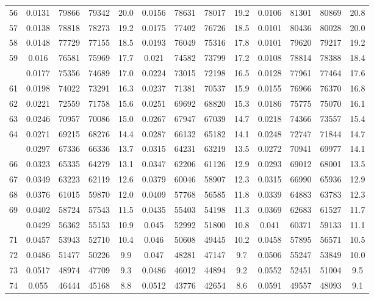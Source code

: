 \documentclass[
  14pt,
]{article}
\begin{document}
\begin{longtable}[t]{lcccccccccccc}
56 & 0.0131 & 79866 & 79342 & 20.0 & 0.0156 & 78631 & 78017 & 19.2 & 0.0106 & 81301 & 80869 & 20.8\\
57 & 0.0138 & 78818 & 78273 & 19.2 & 0.0175 & 77402 & 76726 & 18.5 & 0.0101 & 80436 & 80028 & 20.0\\
58 & 0.0148 & 77729 & 77155 & 18.5 & 0.0193 & 76049 & 75316 & 17.8 & 0.0101 & 79620 & 79217 & 19.2\\
59 & 0.016 & 76581 & 75969 & 17.7 & 0.021 & 74582 & 73799 & 17.2 & 0.0108 & 78814 & 78388 & 18.4\\
\addlinespace
60 & 0.0177 & 75356 & 74689 & 17.0 & 0.0224 & 73015 & 72198 & 16.5 & 0.0128 & 77961 & 77464 & 17.6\\
61 & 0.0198 & 74022 & 73291 & 16.3 & 0.0237 & 71381 & 70537 & 15.9 & 0.0155 & 76966 & 76370 & 16.8\\
62 & 0.0221 & 72559 & 71758 & 15.6 & 0.0251 & 69692 & 68820 & 15.3 & 0.0186 & 75775 & 75070 & 16.1\\
63 & 0.0246 & 70957 & 70086 & 15.0 & 0.0267 & 67947 & 67039 & 14.7 & 0.0218 & 74366 & 73557 & 15.4\\
64 & 0.0271 & 69215 & 68276 & 14.4 & 0.0287 & 66132 & 65182 & 14.1 & 0.0248 & 72747 & 71844 & 14.7\\
\addlinespace
65 & 0.0297 & 67336 & 66336 & 13.7 & 0.0315 & 64231 & 63219 & 13.5 & 0.0272 & 70941 & 69977 & 14.1\\
66 & 0.0323 & 65335 & 64279 & 13.1 & 0.0347 & 62206 & 61126 & 12.9 & 0.0293 & 69012 & 68001 & 13.5\\
67 & 0.0349 & 63223 & 62119 & 12.6 & 0.0379 & 60046 & 58907 & 12.3 & 0.0315 & 66990 & 65936 & 12.9\\
68 & 0.0376 & 61015 & 59870 & 12.0 & 0.0409 & 57768 & 56585 & 11.8 & 0.0339 & 64883 & 63783 & 12.3\\
69 & 0.0402 & 58724 & 57543 & 11.5 & 0.0435 & 55403 & 54198 & 11.3 & 0.0369 & 62683 & 61527 & 11.7\\
\addlinespace
70 & 0.0429 & 56362 & 55153 & 10.9 & 0.045 & 52992 & 51800 & 10.8 & 0.041 & 60371 & 59133 & 11.1\\
71 & 0.0457 & 53943 & 52710 & 10.4 & 0.046 & 50608 & 49445 & 10.2 & 0.0458 & 57895 & 56571 & 10.5\\
72 & 0.0486 & 51477 & 50226 & 9.9 & 0.047 & 48281 & 47147 & 9.7 & 0.0506 & 55247 & 53849 & 10.0\\
73 & 0.0517 & 48974 & 47709 & 9.3 & 0.0486 & 46012 & 44894 & 9.2 & 0.0552 & 52451 & 51004 & 9.5\\
74 & 0.055 & 46444 & 45168 & 8.8 & 0.0512 & 43776 & 42654 & 8.6 & 0.0591 & 49557 & 48093 & 9.1\\

\end{longtable}
\end{document}
